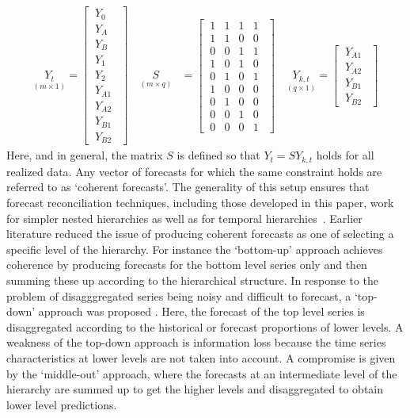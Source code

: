 \documentclass[a4paper,fleqn,11pt]{article}
\begin{document}
\begin{align*}
\underset{(m\times 1)}{Y_t} = \begin{bmatrix}
\ Y_0\ \ \\
\ Y_A\ \ \\
\ Y_B\ \ \\
\ Y_1\ \ \\
\ Y_2\ \ \\
\ Y_{A1}\ \ \\
\ Y_{A2}\ \ \\
\ Y_{B1}\ \ \\
\ Y_{B2}\ \ 
\end{bmatrix} \quad \underset{(m\times q)}{S} &=
\begin{bmatrix}
\ 1 & 1 & 1 & 1 \ \ \\
\ 1 & 1 & 0 & 0 \ \ \\
\ 0 & 0  & 1 & 1\ \ \\
\ 1 & 0 & 1 & 0 \ \ \\
\ 0 & 1 & 0 & 1\ \ \\
\ 1 & 0 & 0 & 0 \ \ \\
\ 0 & 1 & 0 & 0 \ \ \\
\ 0 & 0 & 1 & 0 \ \ \\
\ 0 & 0 & 0 & 1\ \ 
\end{bmatrix} \quad \underset{(q\times 1)}{Y_{k,t}} = \begin{bmatrix}
	\ Y_{A1}\ \ \\
	\ Y_{A2}\ \ \\
	\ Y_{B1}\ \ \\
	\ Y_{B2}\ \ 
\end{bmatrix} 
\end{align*}
Here, and in general, the matrix $S$ is defined so that $Y_t = S Y_{k,t}$ holds for all realized data.  Any vector of forecasts for which the same constraint holds are referred to as `coherent forecasts'. The generality of this setup ensures that forecast reconciliation techniques, including those developed in this paper, work for simpler nested hierarchies as well as for temporal hierarchies~\citep{Athanasopoulos2017}. Earlier literature reduced the issue of producing coherent forecasts as one of selecting a specific level of the hierarchy. For instance the `bottom-up' approach \citep{Gross1990} achieves coherence by producing forecasts for the bottom level series only and then summing these up according to the hierarchical structure. In response to the problem of disagggregated series being noisy and difficult to forecast, a `top-down' approach was proposed \citep[see][and references therein]{Athanasopoulos2009}.  Here, the forecast of the top level series is disaggregated according to the historical or forecast proportions of lower levels. A weakness of the top-down approach is information loss because the time series characteristics at lower levels are not taken into account. A compromise is given by the `middle-out' approach, where the forecasts at an intermediate level of the hierarchy are summed up to get the higher levels and disaggregated to obtain lower level predictions.\\
\end{document}
